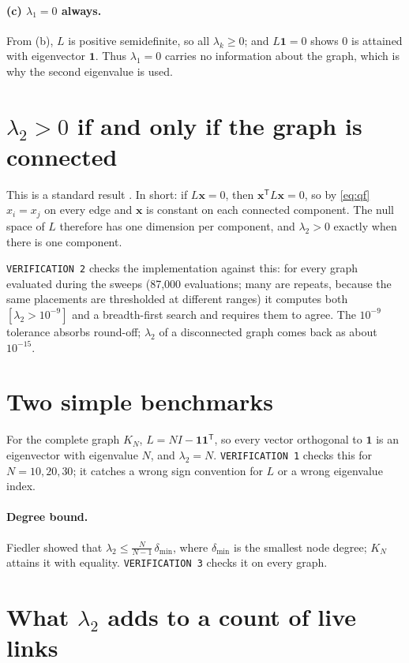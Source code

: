 \documentclass[11pt,a4paper]{article}
\newcommand{\bone}{\mathbf 1}
\newcommand{\bx}{\mathbf x}
\newcommand{\T}{^{\mathsf T}}
\begin{document}
\paragraph{(c) $\lambda_1 = 0$ always.}
From (b), $L$ is positive semidefinite, so all $\lambda_k\ge0$; and $L\bone=0$
shows $0$ is attained with eigenvector $\bone$. Thus $\lambda_1=0$ carries no
information about the graph, which is why the second eigenvalue is used.

\section{$\lambda_2>0$ if and only if the graph is connected}

This is a standard result \cite{fiedler}. In short: if $L\bx = 0$, then
$\bx\T L\bx = 0$, so by \eqref{eq:qf} $x_i = x_j$ on every edge and $\bx$ is
constant on each connected component. The null space of $L$ therefore has one
dimension per component, and $\lambda_2 > 0$ exactly when there is one
component.

\texttt{VERIFICATION 2} checks the implementation against this: for every graph
evaluated during the sweeps (87{,}000 evaluations; many are repeats, because
the same placements are thresholded at different ranges) it computes both
$[\lambda_2>10^{-9}]$ and a breadth-first search and requires them to agree.
The $10^{-9}$ tolerance absorbs round-off; $\lambda_2$ of a disconnected graph
comes back as about $10^{-15}$.

\section{Two simple benchmarks}

For the complete graph $K_N$, $L = NI - \bone\bone\T$, so every vector
orthogonal to $\bone$ is an eigenvector with eigenvalue $N$, and
$\lambda_2 = N$. \texttt{VERIFICATION 1} checks this for $N=10,20,30$; it
catches a wrong sign convention for $L$ or a wrong eigenvalue index.

\paragraph{Degree bound.}
Fiedler \cite[3.5]{fiedler} showed that $\lambda_2 \le \frac{N}{N-1}\,\delta_{\min}$,
where $\delta_{\min}$ is the smallest node degree; $K_N$ attains it with
equality. \texttt{VERIFICATION 3} checks it on every graph.

\section{What $\lambda_2$ adds to a count of live links}
\end{document}
